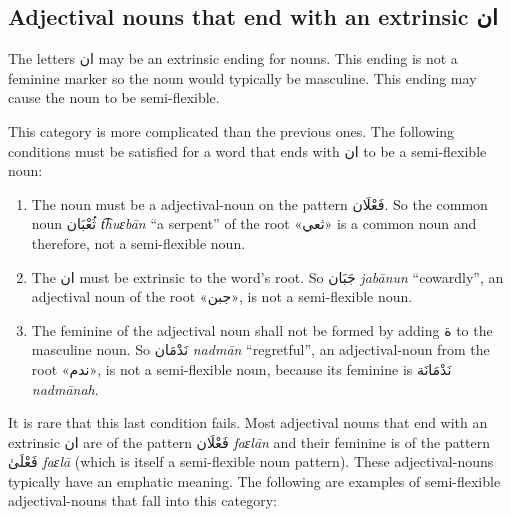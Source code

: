 \documentclass[
  10pt,
]{book}
\providecommand{\tightlist}{%
  \setlength{\itemsep}{0pt}\setlength{\parskip}{0pt}}
\begin{document}
\subsection{\texorpdfstring{Adjectival nouns that end with an extrinsic \foreignlanguage{arabic}{ان}}{Adjectival nouns that end with an extrinsic ان}}\label{adjectival-noun-an-diptote}

The letters \foreignlanguage{arabic}{ان} may be an extrinsic ending for nouns. This ending is not a feminine marker so the noun would typically be masculine. This ending may cause the noun to be semi-flexible.

This category is more complicated than the previous ones. The following conditions must be satisfied for a word that ends with \foreignlanguage{arabic}{ان} to be a semi-flexible noun:

\begin{enumerate}
\def\labelenumi{\arabic{enumi}.}
\tightlist
\item
  The noun must be a adjectival-noun on the pattern \foreignlanguage{arabic}{فَعْلَان}. So the common noun \foreignlanguage{arabic}{ثُعْبَان} \emph{t͡huɛbān} \enquote{a serpent} of the root \foreignlanguage{arabic}{«ثعي»} is a common noun and therefore, not a semi-flexible noun.
\item
  The \foreignlanguage{arabic}{ان} must be extrinsic to the word's root. So \foreignlanguage{arabic}{جَبَان} \emph{jabānun} \enquote{cowardly}, an adjectival noun of the root \foreignlanguage{arabic}{«جبن»}, is not a semi-flexible noun.
\item
  The feminine of the adjectival noun shall not be formed by adding \foreignlanguage{arabic}{ة} to the masculine noun. So \foreignlanguage{arabic}{نَدْمَان} \emph{nadmān} \enquote{regretful}, an adjectival-noun from the root \foreignlanguage{arabic}{«ندم»}, is not a semi-flexible noun, because its feminine is \foreignlanguage{arabic}{نَدْمَانَة} \emph{nadmānah}.
\end{enumerate}

It is rare that this last condition fails. Most adjectival nouns that end with an extrinsic \foreignlanguage{arabic}{ان} are of the pattern \foreignlanguage{arabic}{فَعْلَان} \emph{faɛlān} and their feminine is of the pattern \foreignlanguage{arabic}{فَعْلَىٰ} \emph{faɛlā} (which is itself a semi-flexible noun pattern). These adjectival-nouns typically have an emphatic meaning. The following are examples of semi-flexible adjectival-nouns that fall into this category:
\end{document}
